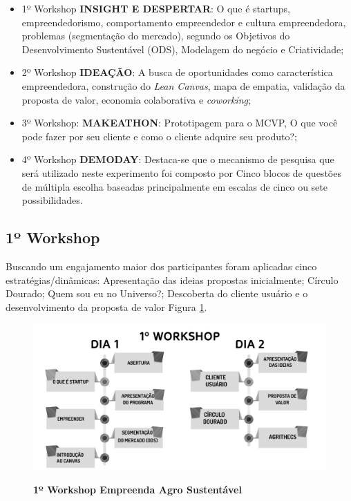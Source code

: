 \begin{itemize}

\item {1º Workshop \textbf{INSIGHT E DESPERTAR}: O que é startups, empreendedorismo, comportamento empreendedor e cultura empreendedora, problemas (segmentação do mercado), segundo os Objetivos do Desenvolvimento Sustentável (ODS), Modelagem do negócio e Criatividade;}
\item {2º Workshop \textbf{IDEAÇÃO}: A busca de oportunidades como característica empreendedora, construção do \textit{Lean Canvas}, mapa de empatia, validação da proposta de valor, economia colaborativa e \textit{coworking};}

\item {3º Workshop: \textbf{MAKEATHON}: Prototipagem para o MCVP, O que você pode fazer por seu cliente e como o cliente adquire seu produto?;}

\item {4º Workshop \textbf{DEMODAY}: Destaca-se que o mecanismo de pesquisa que será utilizado neste experimento foi composto por Cinco blocos de questões de múltipla escolha baseadas principalmente em escalas de cinco ou sete possibilidades.}
\end{itemize}







\subsection{1º Workshop}

Buscando um engajamento maior dos participantes foram
aplicadas cinco estratégias/dinâmicas: Apresentação das ideias propostas inicialmente; Círculo Dourado;
Quem sou eu no Universo?; Descoberta do cliente usuário e o  desenvolvimento da proposta de valor Figura \ref{figura_30}.

\begin{figure}[!h]
\centering
\caption{\textbf{1º Workshop Empreenda Agro Sustentável}}
\includegraphics[scale=0.3]{Imagens/workshop-01.png}
\label{figura_30}
\end{figure}

